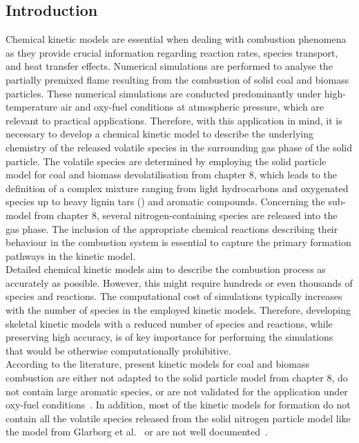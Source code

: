 \begin{refsection}
\begin{abstract}
\end{abstract}



\newpage
\section{Introduction} 
Chemical kinetic models are essential when dealing with combustion phenomena as they provide crucial information regarding reaction rates, species transport, and heat transfer effects. Numerical simulations are performed to analyse the partially premixed flame resulting from the combustion of solid coal and biomass particles. These numerical simulations are conducted predominantly under high-temperature air and oxy-fuel conditions at atmospheric pressure, which are relevant to practical applications. Therefore, with this application in mind, it is necessary to develop a chemical kinetic model to describe the underlying chemistry of the released volatile species in the surrounding gas phase of the solid particle. The volatile species are determined by employing the solid particle model for coal and biomass devolatilisation from chapter 8, which leads to the definition of a complex mixture ranging from light hydrocarbons and oxygenated species up to heavy lignin tars () and aromatic compounds. 
Concerning the  sub-model from chapter 8, several nitrogen-containing species are released into the gas phase. The inclusion of the appropriate chemical reactions describing their behaviour in the combustion system is essential to capture the primary  formation pathways in the kinetic model.
\\
Detailed chemical kinetic models aim to describe the combustion process as accurately as possible. However, this might require hundreds or even thousands of species and reactions. The computational cost of simulations typically increases with the number of species in the employed kinetic models. Therefore, developing skeletal kinetic models with a reduced number of species and reactions, while preserving high accuracy, is of key importance for performing the simulations that would be otherwise computationally prohibitive.
\\
According to the literature, present kinetic models for coal and biomass combustion are either not adapted to the solid particle model from chapter 8, do not contain large aromatic species, or are not validated for the application under oxy-fuel conditions~\cite{Shamooni2021, Goyal2017, Lovas2013}. In addition, most of the kinetic models for  formation do not contain all the volatile species released from the solid nitrogen particle model like the model from Glarborg et al.~\cite{Glarborg2018} or are not well documented~\cite{Shamooni2021}. 

\end{refsection}
